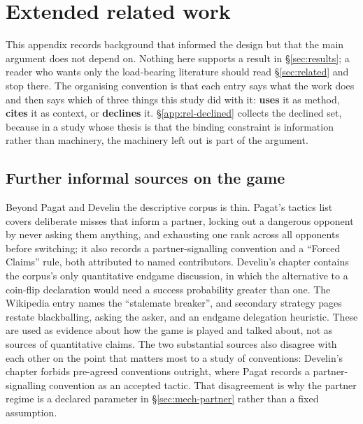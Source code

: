 \section{Extended related work}
\label{app:related}

This appendix records background that informed the design but that the main
argument does not depend on. Nothing here supports a result in
\S\ref{sec:results}; a reader who wants only the load-bearing literature should
read \S\ref{sec:related} and stop there. The organising convention is that each
entry says what the work does and then says which of three things this study
did with it: \textbf{uses} it as method, \textbf{cites} it as context, or
\textbf{declines} it. \S\ref{app:rel-declined} collects the declined set,
because in a study whose thesis is that the binding constraint is information
rather than machinery, the machinery left out is part of the argument.

\subsection{Further informal sources on the game}
\label{app:rel-informal}

Beyond Pagat \cite{pagat} and Develin \cite{develin} the descriptive corpus is
thin. Pagat's tactics list covers deliberate misses that inform a partner,
locking out a dangerous opponent by never asking them anything, and exhausting
one rank across all opponents before switching; it also records a
partner-signalling convention and a ``Forced Claims'' rule, both attributed to
named contributors. Develin's chapter contains the corpus's only quantitative
endgame discussion, in which the alternative to a coin-flip declaration would
need a success probability greater than one. The Wikipedia entry
\cite{wikiliterature} names the ``stalemate breaker'', and secondary strategy
pages \cite{dorsa,strategy-site} restate blackballing, asking the asker, and an
endgame delegation heuristic. These are used as evidence about how the game is
played and talked about, not as sources of quantitative claims. The two
substantial sources also disagree with each other on the point that matters most
to a study of conventions: Develin's chapter forbids pre-agreed conventions
outright, where Pagat records a partner-signalling convention as an accepted
tactic. That disagreement is why the partner regime is a declared parameter in
\S\ref{sec:mech-partner} rather than a fixed assumption.


